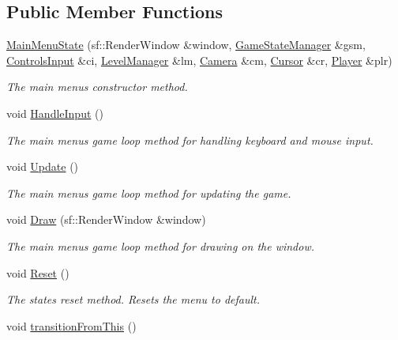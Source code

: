 \subsection*{Public Member Functions}
\begin{DoxyCompactItemize}
\item 
\hyperlink{class_main_menu_state_a319907358bf3fbbc42cab50ac5fdebdc}{Main\+Menu\+State} (sf\+::\+Render\+Window \&window, \hyperlink{class_game_state_manager}{Game\+State\+Manager} \&gsm, \hyperlink{struct_controls_input}{Controls\+Input} \&ci, \hyperlink{class_level_manager}{Level\+Manager} \&lm, \hyperlink{class_camera}{Camera} \&cm, \hyperlink{class_cursor}{Cursor} \&cr, \hyperlink{class_player}{Player} \&plr)
\begin{DoxyCompactList}\small\item\em The main menu\textquotesingle{}s constructor method. \end{DoxyCompactList}\item 
void \hyperlink{class_main_menu_state_ac332ae234d282f4e6657ee9d0685b7ff}{Handle\+Input} ()
\begin{DoxyCompactList}\small\item\em The main menu\textquotesingle{}s game loop method for handling keyboard and mouse input. \end{DoxyCompactList}\item 
void \hyperlink{class_main_menu_state_a35ec35095919057ef7373906b09a9d30}{Update} ()
\begin{DoxyCompactList}\small\item\em The main menu\textquotesingle{}s game loop method for updating the game. \end{DoxyCompactList}\item 
void \hyperlink{class_main_menu_state_a6965e10d73953ef09c63a64685136307}{Draw} (sf\+::\+Render\+Window \&window)
\begin{DoxyCompactList}\small\item\em The main menu\textquotesingle{}s game loop method for drawing on the window. \end{DoxyCompactList}\item 
void \hyperlink{class_main_menu_state_a6f6c9814913db12bc9578411620f9b56}{Reset} ()
\begin{DoxyCompactList}\small\item\em The state\textquotesingle{}s reset method. Resets the menu to default. \end{DoxyCompactList}\item 
void \hyperlink{class_main_menu_state_a632b2e5cc71503e46a59fd29501f6869}{transition\+From\+This} ()
\end{DoxyCompactItemize}


